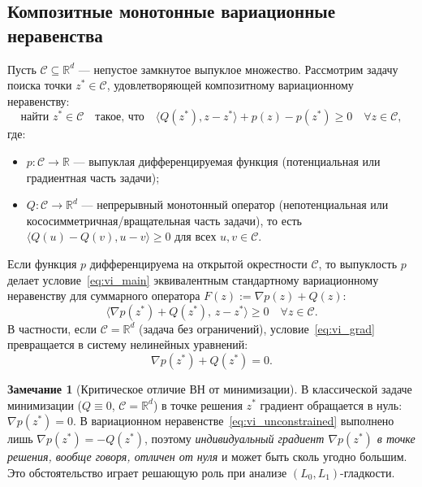 \documentclass[11pt, a4paper]{article}
\theoremstyle{definition}
\newtheorem{remark}{Замечание}[section]
\begin{document}
\subsection{Композитные монотонные вариационные неравенства}

Пусть $\mathcal{C} \subseteq \mathbb{R}^d$ --- непустое замкнутое выпуклое множество. Рассмотрим задачу поиска точки $z^* \in \mathcal{C}$, удовлетворяющей композитному вариационному неравенству:
\begin{equation}\label{eq:vi_main}
\text{найти } z^* \in \mathcal{C} \quad \text{такое, что} \quad \langle Q(z^*), z - z^* \rangle + p(z) - p(z^*) \ge 0 \quad \forall z \in \mathcal{C},
\end{equation}
где:
\begin{itemize}
    \item $p : \mathcal{C} \to \mathbb{R}$ --- выпуклая дифференцируемая функция (потенциальная или градиентная часть задачи);
    \item $Q : \mathcal{C} \to \mathbb{R}^d$ --- непрерывный монотонный оператор (непотенциальная или кососимметричная/вращательная часть задачи), то есть $\langle Q(u) - Q(v), u - v \rangle \ge 0$ для всех $u, v \in \mathcal{C}$.
\end{itemize}

Если функция $p$ дифференцируема на открытой окрестности $\mathcal{C}$, то выпуклость $p$ делает условие~\eqref{eq:vi_main} эквивалентным стандартному вариационному неравенству для суммарного оператора $F(z) := \nabla p(z) + Q(z)$:
\begin{equation}\label{eq:vi_grad}
\langle \nabla p(z^*) + Q(z^*),\, z - z^* \rangle \ge 0 \quad \forall z \in \mathcal{C}.
\end{equation}
В частности, если $\mathcal{C} = \mathbb{R}^d$ (задача без ограничений), условие~\eqref{eq:vi_grad} превращается в систему нелинейных уравнений:
\begin{equation}\label{eq:vi_unconstrained}
\nabla p(z^*) + Q(z^*) = 0.
\end{equation}

\begin{remark}[Критическое отличие ВН от минимизации]\label{rem:grad_nonzero}
В классической задаче минимизации ($Q \equiv 0$, $\mathcal{C} = \mathbb{R}^d$) в точке решения $z^*$ градиент обращается в нуль: $\nabla p(z^*) = 0$. В вариационном неравенстве~\eqref{eq:vi_unconstrained} выполнено лишь $\nabla p(z^*) = -Q(z^*)$, поэтому \emph{индивидуальный градиент $\nabla p(z^*)$ в точке решения, вообще говоря, отличен от нуля} и может быть сколь угодно большим. Это обстоятельство играет решающую роль при анализе $(L_0, L_1)$-гладкости.
\end{remark}
\end{document}
